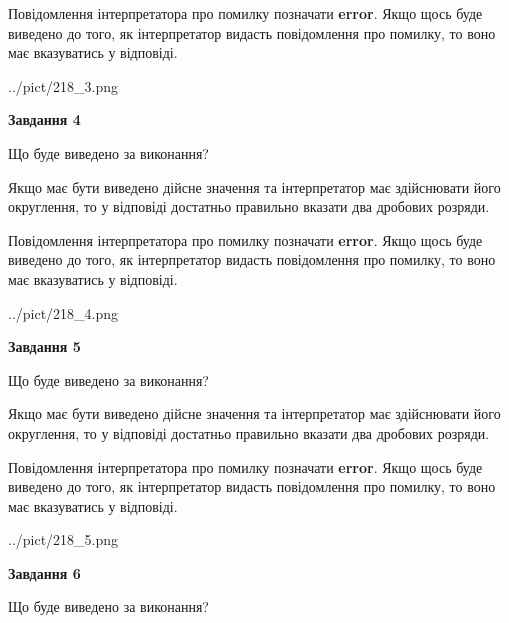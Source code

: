 \documentclass[12pt, ukrainian]{article}
\begin{document}
{\begin {Large}
Повідомлення інтерпретатора про помилку позначати \textbf{error}.
Якщо щось буде виведено до того, як інтерпретатор видасть повідомлення про помилку, 
то воно має вказуватись у відповіді. \par

\begin{center}
	{../pict/218_3.png}
\end{center}
\newpage

{\begin {center}\textbf{Завдання 4}\end {center}}\par
Що буде виведено за виконання? \par

Якщо має бути виведено дійсне значення та інтерпретатор має здійснювати його округлення, 
то у відповіді достатньо правильно вказати два дробових розряди.

Повідомлення інтерпретатора про помилку позначати \textbf{error}.
Якщо щось буде виведено до того, як інтерпретатор видасть повідомлення про помилку, 
то воно має вказуватись у відповіді. \par

\begin{center}
	{../pict/218_4.png}
\end{center}
\newpage

{\begin {center}\textbf{Завдання 5}\end {center}}\par
Що буде виведено за виконання? \par

Якщо має бути виведено дійсне значення та інтерпретатор має здійснювати його округлення, 
то у відповіді достатньо правильно вказати два дробових розряди.

Повідомлення інтерпретатора про помилку позначати \textbf{error}.
Якщо щось буде виведено до того, як інтерпретатор видасть повідомлення про помилку, 
то воно має вказуватись у відповіді. \par

\begin{center}
	{../pict/218_5.png}
\end{center}
\newpage

{\begin {center}\textbf{Завдання 6}\end {center}}\par
Що буде виведено за виконання? \par


\end{Large}}
\end{document}
